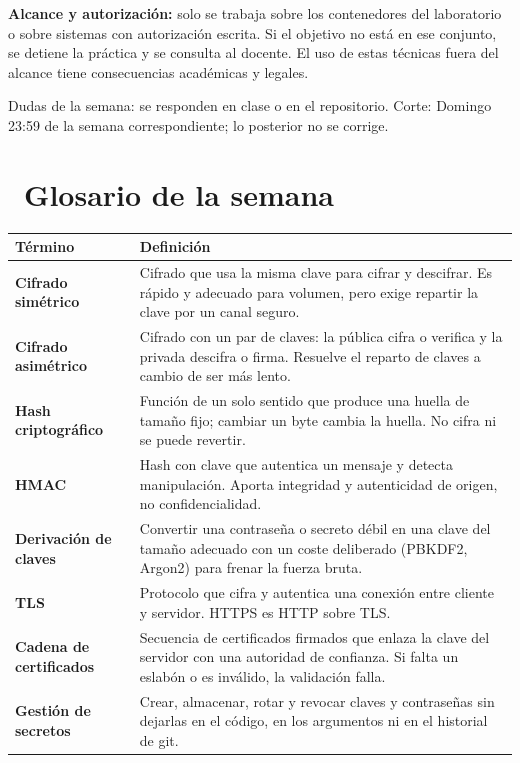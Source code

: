 \documentclass[11pt,a4paper]{article}
\newcommand{\iconotexto}[2]{\textcolor{cyanNeon}{\faIcon{#1}}~#2}
\begin{document}
\begin{tcolorbox}[cajaMejora]\textbf{Alcance y autorización:} solo se trabaja sobre los contenedores del laboratorio o sobre sistemas con autorización escrita. Si el objetivo no está en ese conjunto, se detiene la práctica y se consulta al docente. El uso de estas técnicas fuera del alcance tiene consecuencias académicas y legales.
\end{tcolorbox}

\begin{cajaRecuerda}Dudas de la semana: se responden en clase o en el repositorio. Corte: Domingo 23:59 de la semana correspondiente; lo posterior no se corrige.
\end{cajaRecuerda}

\clearpage

\section{\iconotexto{book}{Glosario de la semana}}

\small
\begin{longtable}{@{}>{\raggedright\arraybackslash}p{4.2cm}>{\raggedright\arraybackslash}p{\dimexpr\linewidth-4.2cm-12pt\relax}@{}}
\toprule
\textbf{Término} & \textbf{Definición}\\
\midrule
\endhead
\bottomrule
\endlastfoot
\textbf{Cifrado simétrico} & Cifrado que usa la misma clave para cifrar y descifrar. Es rápido y adecuado para volumen, pero exige repartir la clave por un canal seguro.\\
\textbf{Cifrado asimétrico} & Cifrado con un par de claves: la pública cifra o verifica y la privada descifra o firma. Resuelve el reparto de claves a cambio de ser más lento.\\
\textbf{Hash criptográfico} & Función de un solo sentido que produce una huella de tamaño fijo; cambiar un byte cambia la huella. No cifra ni se puede revertir.\\
\textbf{HMAC} & Hash con clave que autentica un mensaje y detecta manipulación. Aporta integridad y autenticidad de origen, no confidencialidad.\\
\textbf{Derivación de claves} & Convertir una contraseña o secreto débil en una clave del tamaño adecuado con un coste deliberado (PBKDF2, Argon2) para frenar la fuerza bruta.\\
\textbf{TLS} & Protocolo que cifra y autentica una conexión entre cliente y servidor. HTTPS es HTTP sobre TLS.\\
\textbf{Cadena de certificados} & Secuencia de certificados firmados que enlaza la clave del servidor con una autoridad de confianza. Si falta un eslabón o es inválido, la validación falla.\\
\textbf{Gestión de secretos} & Crear, almacenar, rotar y revocar claves y contraseñas sin dejarlas en el código, en los argumentos ni en el historial de git.\\
\end{longtable}
\end{document}
